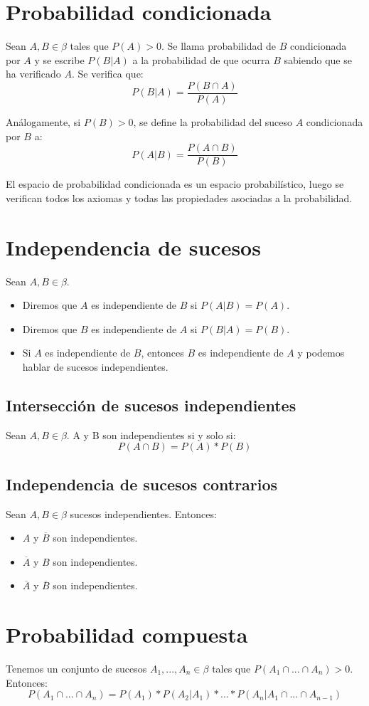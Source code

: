 \section{Probabilidad condicionada}
Sean $A,B \in \beta$ tales que $P(A)>0$. Se llama probabilidad de $B$ condicionada por $A$ y se escribe $P(B|A)$ a la probabilidad de que ocurra $B$ sabiendo que se ha verificado $A$. Se verifica que:
\[P(B|A)=\frac{P(B \cap A)}{P(A)}\]

Análogamente, si $P(B)>0$, se define la probabilidad del suceso $A$ condicionada por $B$ a:
\[P(A|B)=\frac{P(A \cap B)}{P(B)}\]

El espacio de probabilidad condicionada es un espacio probabilístico, luego se verifican todos los axiomas y todas las propiedades asociadas a la probabilidad.

\section{Independencia de sucesos}
Sean $A,B \in \beta$.
\begin{itemize}
\item Diremos que $A$ es independiente de $B$ si $P(A|B)=P(A)$.
\item Diremos que $B$ es independiente de $A$ si $P(B|A)=P(B)$.
\item Si $A$ es independiente de $B$, entonces $B$ es independiente de $A$ y podemos hablar de sucesos independientes.
\end{itemize}
\subsection{Intersección de sucesos independientes}
Sean $A,B \in \beta$. A y B son independientes si y solo si:
\[P(A \cap B)=P(A)*P(B)\]
\subsection{Independencia de sucesos contrarios}
Sean $A,B \in \beta$ sucesos independientes. Entonces:
\begin{itemize}
\item $A$ y $\overline{B}$ son independientes.
\item $\overline{A}$ y $B$ son independientes.
\item $\overline{A}$ y $\overline{B}$ son independientes.
\end{itemize}

\section{Probabilidad compuesta}
Tenemos un conjunto de sucesos $A_{1},...,A_{n} \in \beta$ tales que $P(A_{1} \cap ... \cap A_{n})>0$. Entonces:
\[P(A_{1} \cap ... \cap A_{n}) = P(A_{1})*P(A_{2}|A_{1})*...*P(A_{n}|A_{1} \cap ... \cap A_{n-1})\]

